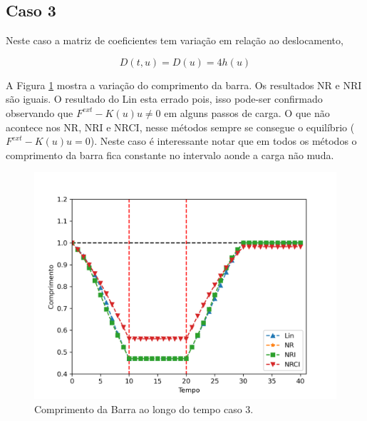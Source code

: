 \documentclass[12pt,a4paper]{article}
\begin{document}
\subsection{Caso 3}

Neste caso a matriz de coeficientes tem variação em relação ao deslocamento,

\begin{equation}
D(t,u) = D(u) = 4h(u)
\end{equation}

A Figura \ref{fig:u_caso3} mostra a variação do comprimento da barra. Os resultados NR e NRI são iguais. O resultado do Lin esta errado pois, isso pode-ser confirmado observando que $F^{ext} - K(u)u \neq 0$ em alguns passos de carga. O que não acontece nos NR, NRI e NRCI, nesse métodos sempre se consegue o equilíbrio ($F^{ext} - K(u)u = 0$). Neste caso é interessante notar que em todos os métodos o comprimento da barra fica constante no intervalo aonde a carga não muda. 
\begin{figure}[H]
	\centering
	\includegraphics[width=1.0\textwidth]{caso3/desloc_caso3.png}
	\caption{Comprimento da Barra ao longo do tempo caso 3.}
	\label{fig:u_caso3}
\end{figure}
\end{document}
